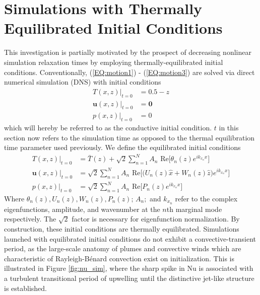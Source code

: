 \documentclass[reprint,amsmath,amssymb,aps]{revtex4-1}
\newcommand\Nu{\mathrm{Nu}}
\begin{document}
\section{Simulations with Thermally Equilibrated Initial Conditions}
This investigation is partially motivated by the prospect of decreasing nonlinear simulation relaxation times by employing thermally-equilibrated initial conditions. 
Conventionally, (\ref{EQ:motion1}) - (\ref{EQ:motion3}) are solved via direct numerical simulation (DNS) with initial conditions
\begin{align}
    T(x, z)\big|_{t=0} &= 0.5 - z \\
    \mathbf{u}(x, z)\big|_{t=0} &= \mathbf{0} \\
    p(x, z)\big|_{t=0} &= 0
\end{align}
which will hereby be referred to as the conductive initial condition. 
$t$ in this section now refers to the simulation time as opposed to the thermal equilibration time parameter used previously. 
We define the equilibrated initial conditions
\begin{align}
    T(x, z)\big|_{t=0} &= \bar{T}(z) + \sqrt{2} \sum_{n=1}^N  A_n \text{ Re} \Big[ \theta_n(z) e^{ik_{x_n}x} \Big] \nonumber \\
    \mathbf{u}(x, z)\big|_{t=0} &= \sqrt{2} \sum_{n=1}^N A_n \text{ Re} \Big[\Big( U_n (z) \hat{x} + W_n(z) \hat{z} \Big) e^{ik_{x_n}x} \Big] \nonumber\\
    p(x, z)\big|_{t=0} &= \sqrt{2} \sum_{n=1}^N A_n \text{ Re} \Big[P_n (z) e^{ik_{x_n}x}\Big]
\end{align}
Where $\theta_n(z), U_n(z), W_n(z), P_n(z); \, A_n; $ and $k_{x_n}$ refer to the complex eigenfunctions, amplitude, and wavenumber at the $n$th marginal mode respectively. 
The $\sqrt{2}$ factor is necessary for eigenfunction normalization. 
By construction, these initial conditions are thermally equilibrated. 
Simulations launched with equilibrated initial conditions do not exhibit a convective-transient period, as the large-scale anatomy of plumes and convective winds which are characteristic of Rayleigh-B\'enard convection exist on initialization. 
This is illustrated in Figure \ref{fig:nu_sim}, where the sharp spike in $\Nu$ is associated with a turbulent transitional period of upwelling until the distinctive jet-like structure is established. 
\end{document}
